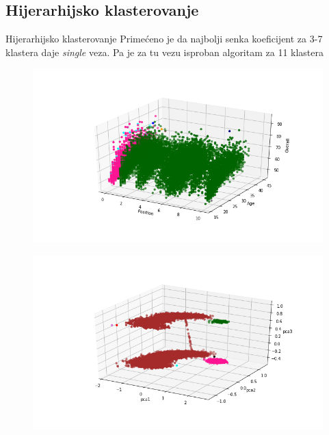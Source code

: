 \documentclass[12pt]{beamer}
\begin{document}
\subsection{Hijerarhijsko klasterovanje}
\begin{frame}[t]{Hijerarhijsko klasterovanje}
Primećeno je da najbolji senka koeficijent za
3-7 klastera
daje \emph{single} veza. Pa je za tu vezu isproban algoritam za 11 klastera 

\begin{figure}
\includegraphics[scale=0.3]{../agglomerative_11_3d_overall_age_position}
\end{figure}

\end{frame}

\begin{frame}
\begin{figure}
\includegraphics[scale=0.4]{../agglomerative_11_pca_3d}
\end{figure}
\end{frame}
\end{document}
